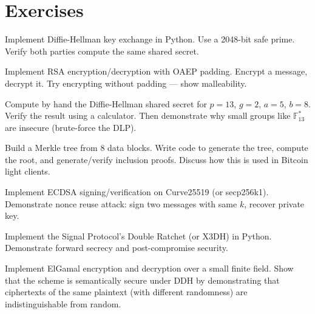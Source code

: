 \section{Exercises}
\label{sec:crypto:exercises}

\begin{exercise}[Basic]
Implement Diffie-Hellman key exchange in Python. Use a 2048-bit safe prime. Verify both parties compute the same shared secret.
\end{exercise}

\begin{exercise}[Basic]
Implement RSA encryption/decryption with OAEP padding. Encrypt a message, decrypt it. Try encrypting without padding — show malleability.
\end{exercise}

\begin{exercise}[Basic]
Compute by hand the Diffie-Hellman shared secret for $p = 13$, $g = 2$, $a = 5$, $b = 8$. Verify the result using a calculator. Then demonstrate why small groups like $\mathbb{F}_{13}^*$ are insecure (brute-force the DLP).
\end{exercise}

\begin{exercise}[Basic]
Build a Merkle tree from 8 data blocks. Write code to generate the tree, compute the root, and generate/verify inclusion proofs. Discuss how this is used in Bitcoin light clients.
\end{exercise}

\begin{exercise}[Intermediate]
Implement ECDSA signing/verification on Curve25519 (or secp256k1). Demonstrate nonce reuse attack: sign two messages with same $k$, recover private key.
\end{exercise}

\begin{exercise}[Intermediate]
Implement the Signal Protocol's Double Ratchet (or X3DH) in Python. Demonstrate forward secrecy and post-compromise security.
\end{exercise}

\begin{exercise}[Intermediate]
Implement ElGamal encryption and decryption over a small finite field. Show that the scheme is semantically secure under DDH by demonstrating that ciphertexts of the same plaintext (with different randomness) are indistinguishable from random.
\end{exercise}

